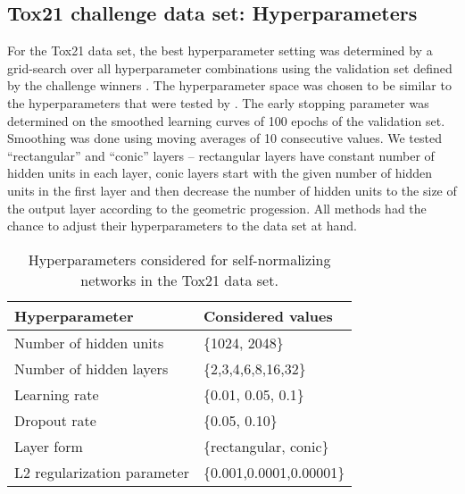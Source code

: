 \documentclass{article}
\begin{document}
\clearpage

\subsection{Tox21 challenge data set: Hyperparameters} 
For the Tox21 data set, the best hyperparameter setting was determined by a grid-search over all
hyperparameter combinations using the validation set defined by the challenge winners \citep{bib:Mayr2016}.
The hyperparameter space was chosen to be similar to the hyperparameters that were tested by \citet{bib:Mayr2016}.
The early stopping parameter was determined on the smoothed learning curves of 100 epochs 
of the validation set. Smoothing was done using moving averages of 10 consecutive 
values. We tested ``rectangular'' and ``conic'' layers -- rectangular layers have 
constant number of hidden units in each layer, conic layers start with the given 
number of hidden units in the first layer and then decrease the number of hidden units
to the size of the output layer according to the geometric progession.
All methods had the chance to adjust their hyperparameters to the data set at hand. 

\begin{table}[htp]
\begin{center}
\caption{Hyperparameters considered for self-normalizing networks in the Tox21 data set.}

\begin{tabular}{ll}
\toprule
Hyperparameter  & Considered values \\ 
\midrule
  Number of hidden units & \{1024, 2048\} \\
  Number of hidden layers & \{2,3,4,6,8,16,32\} \\
  Learning rate & \{0.01, 0.05, 0.1\} \\
  Dropout rate & \{0.05, 0.10\}\\
  Layer form & \{rectangular, conic\} \\
  L2 regularization parameter &  \{0.001,0.0001,0.00001\} \\
\bottomrule
\end{tabular}
\end{center}

\end{table}
\end{document}
